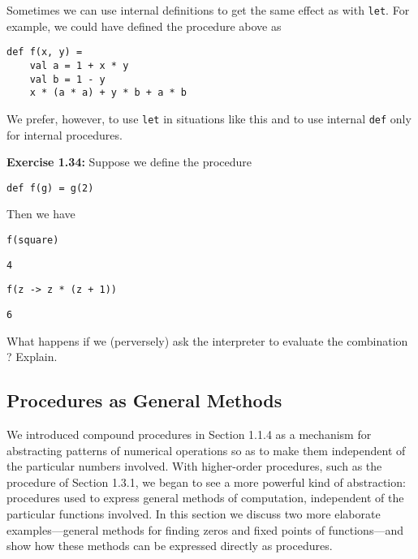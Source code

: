Sometimes we can use internal definitions to get the same effect as with \texttt{let}. For example, we could have defined the procedure  above as

\begin{lstlisting}[style=slate]
def f(x, y) =
    val a = 1 + x * y
    val b = 1 - y
    x * (a * a) + y * b + a * b
\end{lstlisting}

We prefer, however, to use \texttt{let} in situations like this and to use internal \texttt{def} only for internal procedures.

\textbf{Exercise 1.34:} Suppose we define the procedure

\begin{lstlisting}[style=slate]
def f(g) = g(2)
\end{lstlisting}

Then we have

\begin{lstlisting}[style=slate]
f(square)
\end{lstlisting}
\begin{verbatim}
4
\end{verbatim}

\begin{lstlisting}[style=slate]
f(z -> z * (z + 1))
\end{lstlisting}
\begin{verbatim}
6
\end{verbatim}

What happens if we (perversely) ask the interpreter to evaluate the combination ? Explain.

\subsection{Procedures as General Methods}

We introduced compound procedures in Section 1.1.4 as a mechanism for abstracting patterns of numerical operations so as to make them independent of the particular numbers involved. With higher-order procedures, such as the  procedure of Section 1.3.1, we began to see a more powerful kind of abstraction: procedures used to express general methods of computation, independent of the particular functions involved. In this section we discuss two more elaborate examples---general methods for finding zeros and fixed points of functions---and show how these methods can be expressed directly as procedures.

